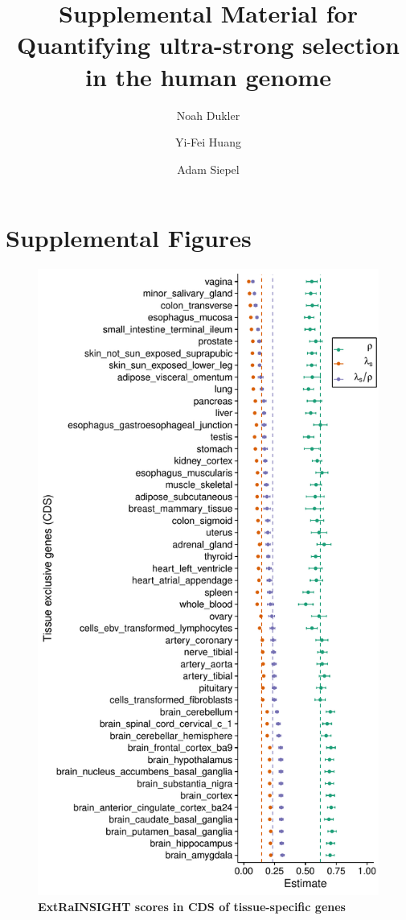 \documentclass[times, twoside, watermark]{zHenriquesLab-StyleBioRxiv}
\begin{document}
\title{Supplemental Material for Quantifying ultra-strong selection in the human genome}
\author[$\ast$, 1]{Noah Dukler}
\author[ $\dagger$, 1]{Yi-Fei Huang}
\author[$\ast$, 2, \Letter]{Adam Siepel}



\section*{Supplemental Figures}
\begin{figure}[t]
    \centering
    \includegraphics[width=0.6\linewidth]{supplemental_figures/tissue_specificity_cds_ratio.pdf}
    \caption{\textbf{\textbf{ExtRaINSIGHT scores in CDS of tissue-specific genes}}}
    \label{Sfig:tissue_specific_scores}
\end{figure}
\end{document}
